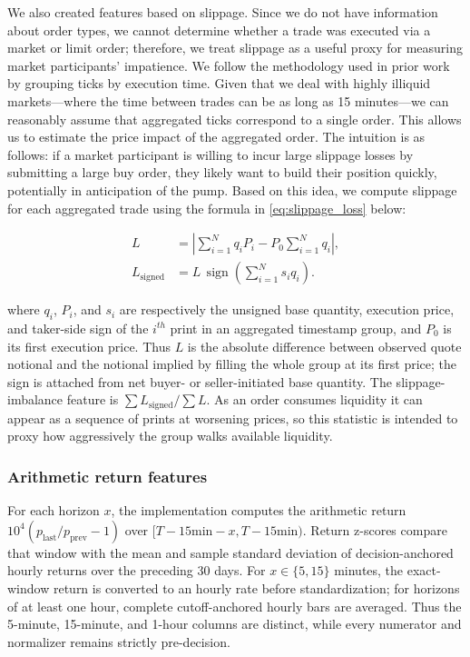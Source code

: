\documentclass{ieeeaccess}
\begin{document}
We also created features based on slippage. Since we do not have information about order types, we cannot determine whether a trade was executed via a market or limit order; therefore, we treat slippage as a useful proxy for measuring market participants’ impatience. We follow the methodology used in prior work by grouping ticks by execution time. Given that we deal with highly illiquid markets—where the time between trades can be as long as 15 minutes—we can reasonably assume that aggregated ticks correspond to a single order. This allows us to estimate the price impact of the aggregated order. The intuition is as follows: if a market participant is willing to incur large slippage losses by submitting a large buy order, they likely want to build their position quickly, potentially in anticipation of the pump. Based on this idea, we compute slippage for each aggregated trade using the formula in \eqref{eq:slippage_loss} below:

\begin{equation}
    \begin{aligned}
        L &= \left|\sum_{i=1}^{N} q_i P_i-P_0\sum_{i=1}^{N}q_i\right|, \\
        L_{\mathrm{signed}} &= L\,\operatorname{sign}\!\left(\sum_{i=1}^{N}s_iq_i\right).
    \end{aligned}
    \label{eq:slippage_loss}
\end{equation}

where $q_i$, $P_i$, and $s_i$ are respectively the unsigned base quantity, execution price, and taker-side sign of the $i^{th}$ print in an aggregated timestamp group, and $P_0$ is its first execution price. Thus $L$ is the absolute difference between observed quote notional and the notional implied by filling the whole group at its first price; the sign is attached from net buyer- or seller-initiated base quantity. The slippage-imbalance feature is $\sum L_{\mathrm{signed}}/\sum L$. As an order consumes liquidity it can appear as a sequence of prints at worsening prices, so this statistic is intended to proxy how aggressively the group walks available liquidity.

\subsubsection{Arithmetic return features}

For each horizon $x$, the implementation computes the arithmetic return $10^4(p_{\mathrm{last}}/p_{\mathrm{prev}}-1)$ over $[T-15\text{min}-x,T-15\text{min})$. Return z-scores compare that window with the mean and sample standard deviation of decision-anchored hourly returns over the preceding 30 days. For $x\in\{5,15\}$ minutes, the exact-window return is converted to an hourly rate before standardization; for horizons of at least one hour, complete cutoff-anchored hourly bars are averaged. Thus the 5-minute, 15-minute, and 1-hour columns are distinct, while every numerator and normalizer remains strictly pre-decision.
\end{document}
